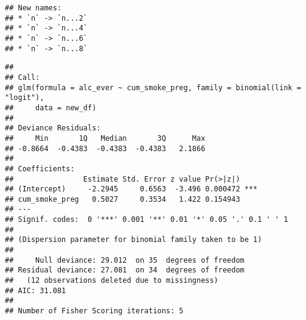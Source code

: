 \documentclass[
]{article}
\newenvironment{Shaded}{\begin{snugshade}}{\end{snugshade}}
\newcommand{\AttributeTok}[1]{\textcolor[rgb]{0.13,0.29,0.53}{#1}}
\newcommand{\CommentTok}[1]{\textcolor[rgb]{0.56,0.35,0.01}{\textit{#1}}}
\newcommand{\FunctionTok}[1]{\textcolor[rgb]{0.13,0.29,0.53}{\textbf{#1}}}
\newcommand{\NormalTok}[1]{#1}
\newcommand{\OtherTok}[1]{\textcolor[rgb]{0.56,0.35,0.01}{#1}}
\newcommand{\SpecialCharTok}[1]{\textcolor[rgb]{0.81,0.36,0.00}{\textbf{#1}}}
\newcommand{\StringTok}[1]{\textcolor[rgb]{0.31,0.60,0.02}{#1}}
\begin{document}
\begin{verbatim}
## New names:
## * `n` -> `n...2`
## * `n` -> `n...4`
## * `n` -> `n...6`
## * `n` -> `n...8`
\end{verbatim}

\begin{Shaded}
\end{Shaded}

\begin{verbatim}
## 
## Call:
## glm(formula = alc_ever ~ cum_smoke_preg, family = binomial(link = "logit"), 
##     data = new_df)
## 
## Deviance Residuals: 
##     Min       1Q   Median       3Q      Max  
## -0.8664  -0.4383  -0.4383  -0.4383   2.1866  
## 
## Coefficients:
##                Estimate Std. Error z value Pr(>|z|)    
## (Intercept)     -2.2945     0.6563  -3.496 0.000472 ***
## cum_smoke_preg   0.5027     0.3534   1.422 0.154943    
## ---
## Signif. codes:  0 '***' 0.001 '**' 0.01 '*' 0.05 '.' 0.1 ' ' 1
## 
## (Dispersion parameter for binomial family taken to be 1)
## 
##     Null deviance: 29.012  on 35  degrees of freedom
## Residual deviance: 27.081  on 34  degrees of freedom
##   (12 observations deleted due to missingness)
## AIC: 31.081
## 
## Number of Fisher Scoring iterations: 5
\end{verbatim}
\end{document}
